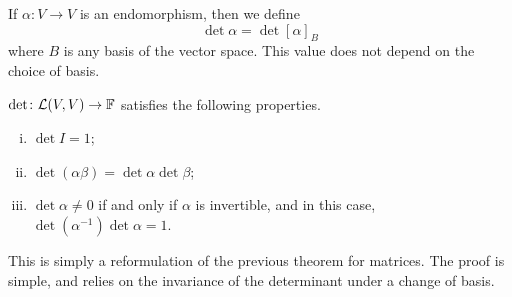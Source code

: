 \documentclass[a4paper]{article}
\begin{document}
\begin{definition}
	If $ \alpha :V\to V $ is an endomorphism, then we define
	\[
		\det \alpha = \det [\alpha]_{B}
	\]
	where $ B $ is any basis of the vector space.
	This value does not depend on the choice of basis.
\end{definition}

\begin{theorem}
	$ \det \colon {\mathcal{L}}(V,V) \to {\mathbb{F}} $ satisfies the following properties.
	\begin{enumerate}[(i)]
		\item $ \det I = 1 $;
		\item $ \det (\alpha\beta) = \det\alpha \det\beta $;
		\item $ \det \alpha \neq 0 $ if and only if $ \alpha $ is invertible, and in this case, $ \det(\alpha^{-1}) \det \alpha = 1 $.
	\end{enumerate}
\end{theorem}
This is simply a reformulation of the previous theorem for matrices.
The proof is simple, and relies on the invariance of the determinant under a change of basis.
\end{document}
